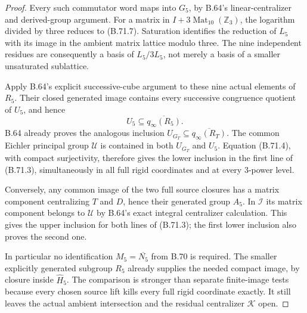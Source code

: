 \begin{proof}
Every such commutator word maps into $G_5$, by B.64's
linear-centralizer and derived-group argument.
For a matrix in $I+3\operatorname{Mat}_{10}(\mathbb Z_3)$,
the logarithm divided by three reduces to (B.71.7).
Saturation identifies the reduction of $L_5$ with
its image in the ambient matrix lattice modulo three.
The nine independent residues are consequently a
basis of $L_5/3L_5$, not merely a basis of a smaller
unsaturated sublattice.

Apply B.64's explicit successive-cube argument to
these nine actual elements of $R_5$.
Their closed generated image contains every successive
congruence quotient of $U_5$, and hence
\[
                  U_5\subseteq\overline{q_\infty(R_5)}.
                                                               \tag{B.71.8}
\]
B.64 already proves the analogous inclusion
$U_{G_T}\subseteq\overline{q_\infty(R_T)}$.
The common Eichler principal group $\mathcal U$ is
contained in both $U_{G_T}$ and $U_5$.
Equation (B.71.4), with compact surjectivity, therefore
gives the lower inclusion in the first line of
(B.71.3), simultaneously in all full rigid coordinates
and at every $3$-power level.

Conversely, any common image of the two full source
closures has a matrix component centralizing $T$ and
$D$, hence their generated group $A_5$.
In $\mathcal I$ its matrix component belongs to
$\mathcal U$ by B.64's exact integral centralizer
calculation.  This gives the upper inclusion for
both lines of (B.71.3); the first lower inclusion
also proves the second one.

In particular no identification
$M_5=\overline{N_5}$ from B.70 is required.
The smaller explicitly generated subgroup $R_5$
already supplies the needed compact image, by closure
inside $\widehat H_5$.
The comparison is stronger than separate finite-image
tests because every chosen source lift kills every
full rigid coordinate exactly.
It still leaves the actual ambient intersection and
the residual centralizer $\mathcal K$ open.
\end{proof}
